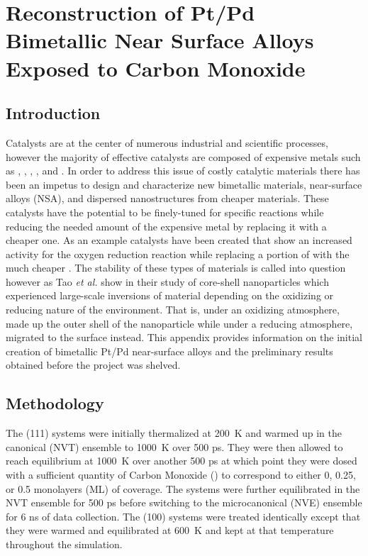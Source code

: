 
\chapter{Reconstruction of Pt/Pd Bimetallic Near Surface Alloys Exposed to Carbon Monoxide}


\section{Introduction}


Catalysts are at the center of numerous industrial and scientific processes,
however the majority of effective catalysts are composed of expensive metals
such as , , , , and .  In order to address
this issue of costly catalytic materials there has been an impetus to design
and characterize new bimetallic materials,\citep{Yu:2012by, Han:2015qr}
near-surface alloys (NSA),\citep{Jan-Knudsen:2007fe, Stephens:2011bv} and
dispersed nanostructures\citep{Shibata:2002hh,Kugai:2011rt} from cheaper
materials.  These catalysts have the potential to be finely-tuned for specific
reactions while reducing the needed amount of the expensive metal by replacing
it with a cheaper one. As an example  catalysts have been created
that show an increased activity for the oxygen reduction reaction while
replacing a portion of  with the much cheaper
.\citep{Stamenkovic:2007kk,Tuaev:2013fk} The stability of these types of
materials is called into question however as Tao {\em et al.} show in their
study of  core-shell nanoparticles which experienced large-scale
inversions of material depending on the oxidizing or reducing nature of the
environment.\citep{Tao:2008aa} That is, under an oxidizing atmosphere, 
made up the outer shell of the nanoparticle while under a reducing atmosphere,
 migrated to the surface instead. This appendix provides information on
the initial creation of bimetallic Pt/Pd near-surface alloys and the
preliminary results obtained before the project was shelved.

\section{Methodology}
The (111) systems were initially thermalized at 200~K and warmed up in the
canonical (NVT) ensemble  to 1000~K over 500 ps. They were then allowed to
reach equilibrium at 1000~K over another 500 ps at which point they were dosed
with a sufficient quantity of Carbon Monoxide () to correspond to either
0, 0.25, or 0.5 monolayers (ML) of coverage. The systems were further
equilibrated in the NVT ensemble for 500 ps before switching to the
microcanonical (NVE) ensemble for 6 ns of data collection. The (100) systems
were treated identically except that they were warmed and equilibrated at 600~K
and kept at that temperature throughout the simulation.

